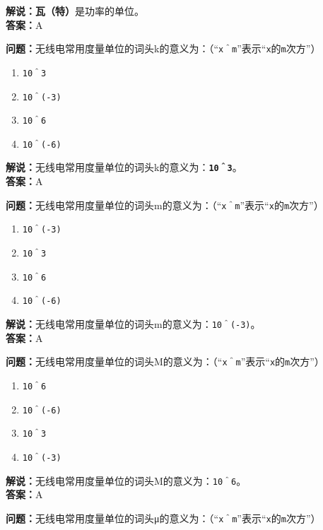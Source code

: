 \textbf{解说：瓦（特）}是功率的单位。\\\textbf{答案：}A



\textbf{问题：}无线电常用度量单位的词头k的意义为：（“\texttt{x＾m}”表示“\texttt{x}的\texttt{m}次方”）

\begin{enumerate}[label=\Alph*), leftmargin=1cm]
	\item \texttt{10＾3}
	\item \texttt{10＾(-3)}
	\item \texttt{10＾6}
	\item \texttt{10＾(-6)}
\end{enumerate}

\textbf{解说：}无线电常用度量单位的词头k的意义为：\textbf{\texttt{10＾3}}。\\\textbf{答案：}A



\textbf{问题：}无线电常用度量单位的词头m的意义为：（“\texttt{x＾m}”表示“\texttt{x}的\texttt{m}次方”）

\begin{enumerate}[label=\Alph*), leftmargin=1cm]
	\item \texttt{10＾(-3)}
	\item \texttt{10＾3}
	\item \texttt{10＾6}
	\item \texttt{10＾(-6)}
\end{enumerate}

\textbf{解说：}无线电常用度量单位的词头m的意义为：\texttt{10＾(-3)}。\\\textbf{答案：}A



\textbf{问题：}无线电常用度量单位的词头M的意义为：（“\texttt{x＾m}”表示“\texttt{x}的\texttt{m}次方”）

\begin{enumerate}[label=\Alph*), leftmargin=1cm]
	\item \texttt{10＾6}
	\item \texttt{10＾(-6)}
	\item \texttt{10＾3}
	\item \texttt{10＾(-3)}
\end{enumerate}

\textbf{解说：}无线电常用度量单位的词头M的意义为：\texttt{10＾6}。\\\textbf{答案：}A



\textbf{问题：}无线电常用度量单位的词头μ的意义为：（“\texttt{x＾m}”表示“\texttt{x}的\texttt{m}次方”）

